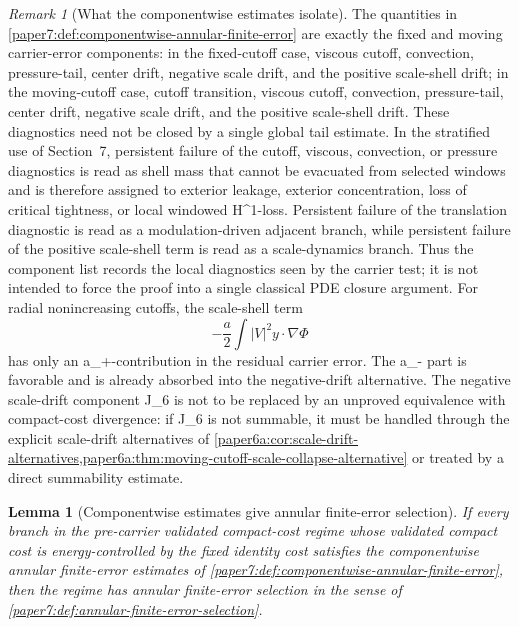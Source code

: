 \documentclass[11pt]{amsart}
\def\({}%
\def\){}%
\theoremstyle{plain}
\newtheorem{lemma}[lemma]{Lemma}
\theoremstyle{definition}
\theoremstyle{remark}
\newtheorem{remark}[remark]{Remark}
\begin{document}
\begin{remark}[What the componentwise estimates isolate]
\label{paper7:rem:componentwise-annular-residual}
The quantities in
\cref{paper7:def:componentwise-annular-finite-error} are exactly the fixed and
moving carrier-error components: in the fixed-cutoff case, viscous cutoff,
convection, pressure-tail, center drift, negative scale drift, and the
positive scale-shell drift; in the moving-cutoff case, cutoff transition, viscous
cutoff, convection, pressure-tail, center drift, negative scale drift, and the
positive scale-shell drift.  These diagnostics need not be closed by a single
global tail estimate.  In the stratified use of Section~7, persistent failure
of the cutoff, viscous, convection, or pressure diagnostics is read as shell
mass that cannot be evacuated from selected windows and is therefore assigned to
exterior leakage, exterior concentration, loss of critical tightness, or local
windowed \(H^1\)-loss.  Persistent failure of the translation diagnostic is
read as a modulation-driven adjacent branch, while persistent failure of the
positive scale-shell term is read as a scale-dynamics branch.  Thus the
component list records the local diagnostics seen by the carrier test; it is
not intended to force the proof into a single classical PDE closure argument.
For radial nonincreasing cutoffs, the scale-shell term
\[
  -\frac{a}{2}\int |V|^2 y\cdot\nabla\Phi
\]
has only an \(a_+\)-contribution in the residual carrier error.  The \(a_-\)
part is favorable and is already absorbed into the negative-drift alternative.
The negative scale-drift component \(J_6\) is not to be replaced by an
unproved equivalence with compact-cost divergence: if \(J_6\) is not summable,
it must be handled through the explicit scale-drift alternatives of
\cref{paper6a:cor:scale-drift-alternatives,paper6a:thm:moving-cutoff-scale-collapse-alternative}
or treated by a direct summability estimate.
\end{remark}

\begin{lemma}[Componentwise estimates give annular finite-error selection]
\label{paper7:lem:componentwise-gives-annular-finite-error}
If every branch in the pre-carrier validated compact-cost regime whose
validated compact cost is energy-controlled by the fixed identity cost
satisfies the componentwise annular finite-error estimates of
\cref{paper7:def:componentwise-annular-finite-error}, then the regime has
annular finite-error selection in the sense of
\cref{paper7:def:annular-finite-error-selection}.
\end{lemma}
\end{document}
